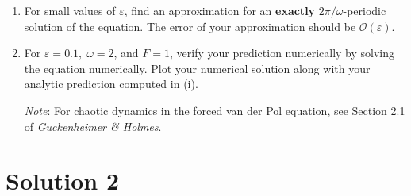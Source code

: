 \documentclass[twoside,10pt,a4paper]{article}
\begin{document}
\begin{enumerate}[label=(\roman*)]
	\item For small values of $\varepsilon$, find an approximation for an \textbf{exactly} $2\pi/\omega$-periodic solution of the equation. The error of your approximation should be $\mathcal{O}(\varepsilon)$.
	\item For $\varepsilon = 0.1, \; \omega = 2$, and $F = 1$, verify your prediction numerically by solving the equation numerically. Plot your numerical solution along with your analytic prediction computed in (i).

\textit{Note}: For chaotic dynamics in the forced van der Pol equation, see Section 2.1 of \textit{Guckenheimer \& Holmes}.
\end{enumerate}

\section*{Solution 2}
\end{document}

